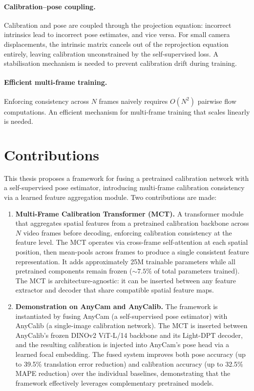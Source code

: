 \paragraph{Calibration--pose coupling.}
Calibration and pose are coupled through the projection equation: incorrect intrinsics lead to incorrect pose estimates, and vice versa. For small camera displacements, the intrinsic matrix cancels out of the reprojection equation entirely, leaving calibration unconstrained by the self-supervised loss. A stabilisation mechanism is needed to prevent calibration drift during training.

\paragraph{Efficient multi-frame training.}
Enforcing consistency across $N$ frames naively requires $O(N^2)$ pairwise flow computations. An efficient mechanism for multi-frame training that scales linearly is needed.

\section{Contributions}\label{sec:contributions}

This thesis proposes a framework for fusing a pretrained calibration network with a self-supervised pose estimator, introducing multi-frame calibration consistency via a learned feature aggregation module. Two contributions are made:

\begin{enumerate}
    \item \textbf{Multi-Frame Calibration Transformer (MCT).} A transformer module that aggregates spatial features from a pretrained calibration backbone across $N$ video frames before decoding, enforcing calibration consistency at the feature level. The MCT operates via cross-frame self-attention at each spatial position, then mean-pools across frames to produce a single consistent feature representation. It adds approximately 25M trainable parameters while all pretrained components remain frozen (${\sim}7.5\%$ of total parameters trained). The MCT is architecture-agnostic: it can be inserted between any feature extractor and decoder that share compatible spatial feature maps.

    \item \textbf{Demonstration on AnyCam and AnyCalib.} The framework is instantiated by fusing AnyCam (a self-supervised pose estimator) with AnyCalib (a single-image calibration network). The MCT is inserted between AnyCalib's frozen DINOv2 ViT-L/14 backbone and its Light-DPT decoder, and the resulting calibration is injected into AnyCam's pose head via a learned focal embedding. The fused system improves both pose accuracy (up to 39.5\% translation error reduction) and calibration accuracy (up to 32.5\% MAPE reduction) over the individual baselines, demonstrating that the framework effectively leverages complementary pretrained models.
\end{enumerate}

